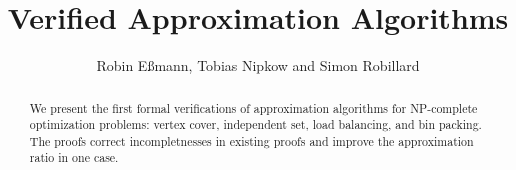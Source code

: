 \documentclass[11pt,a4paper]{article}
\begin{document}
\title{Verified Approximation Algorithms}
\author{Robin E{\ss}mann, Tobias Nipkow and Simon Robillard}
\maketitle

\begin{abstract}
We present the first formal verifications of approximation algorithms
for NP-complete optimization problems:
vertex cover, independent set, load balancing, and bin packing.
The proofs correct incompletnesses in existing proofs
and improve the approximation ratio in one case.
\end{abstract}

\tableofcontents





\end{document}
